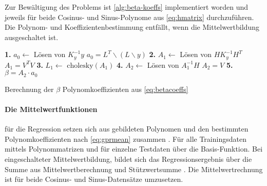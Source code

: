 Zur Bewältigung des Problems ist \autoref{alg:beta-koeffs} implementiert worden und jeweils für beide Cosinus- und Sinus-Polynome aus \autoref{eq:hmatrix} durchzuführen. Die Polynom- und Koeffizientenbestimmung entfällt, wenn die Mittelwertbildung ausgeschaltet ist.


\begin{algorithm}[hp]
	\SetAlgoLined
	\textbf{1.} $a_0 \leftarrow$ Lösen von $K_y^{-1} y$\;
	\Indp 
		$a_0 = L^T \backslash (L \backslash y)$\;
	\Indm
	\textbf{2.} $A_1 \leftarrow$ Lösen von $H K_y^{-1} H^T$\;
	\Indp
		$A_1 = V^T V$\;
	\Indm
	\textbf{3.} $L_1 \leftarrow$ $\text{cholesky}(A_1)$\;
	\textbf{4.} $A_2 \leftarrow$ Lösen von $A_1^{-1} H$\;
	\Indp
		$A_2 = V$\;
	\Indm
	\textbf{5.} $\beta = A_2 \cdot a_0$\;
	\caption{Berechnung der $\beta$ Polynomkoeffizienten aus \autoref{eq:betacoeffs}}
	\label{alg:beta-koeffs}
\end{algorithm}


\clearpage


\paragraph*{Die Mittelwertfunktionen} für die Regression setzen sich aus gebildeten Polynomen und den bestimmten Polynomkoeffizienten nach \autoref{eq:gprmean} zusammen \cite{Rasmussen2006}. Für alle Trainingsdaten mittels Polynommatrizen und für einzelne Testdaten über die Basis-Funktion. Bei eingeschalteter Mittelwertbildung, bildet sich das Regressionsergebnis über die Summe aus Mittelwertberechnung und Stützwertsumme \cite{Rasmussen2006}. Die Mittelwertrechnung ist für beide Cosinus- und Sinus-Datensätze umzusetzen. 


